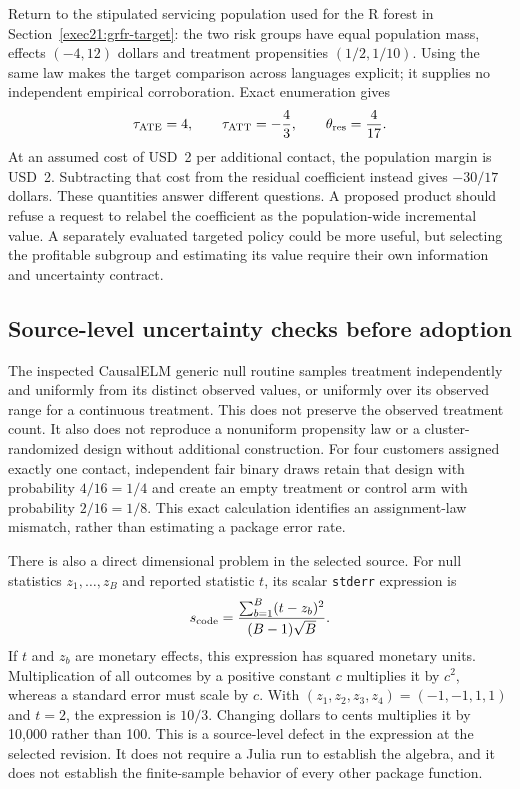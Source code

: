 Return to the stipulated servicing population used for the R forest in
Section~\ref{exec21:grfr-target}: the two risk groups have equal population
mass, effects $(-4,12)$ dollars and treatment propensities $(1/2,1/10)$.
Using the same law makes the target comparison across languages explicit;
it supplies no independent empirical corroboration. Exact enumeration gives
\begin{equation}
\label{exec21:effects-targetexample}
 \tau_{\rm ATE}=4,\qquad
 \tau_{\rm ATT}=-\frac43,\qquad
 \theta_{\rm res}=\frac4{17}.
\end{equation}
At an assumed cost of USD~2 per additional contact, the population margin is
USD~2. Subtracting that cost from the residual coefficient instead gives
$-30/17$ dollars. These quantities answer different questions. A proposed
product should refuse a request to relabel the coefficient as the
population-wide incremental value. A separately evaluated targeted policy
could be more useful, but selecting the profitable subgroup and estimating
its value require their own information and uncertainty contract.
\citep{exec21_effects_reference}

\subsection{Source-level uncertainty checks before adoption}
\label{exec21:effects-uncertainty}

The inspected CausalELM generic null routine samples treatment independently
and uniformly from its distinct observed values, or uniformly over its
observed range for a continuous treatment. This does not preserve the
observed treatment count. It also does not reproduce a nonuniform propensity
law or a cluster-randomized design without additional construction. For four
customers assigned exactly one contact, independent fair binary draws retain
that design with probability $4/16=1/4$ and create an empty treatment or
control arm with probability $2/16=1/8$. This exact calculation identifies an
assignment-law mismatch, rather than estimating a package error rate.
\citep{exec21_effects_causalelm,exec21_effects_reference}

There is also a direct dimensional problem in the selected source. For null
statistics $z_1,\ldots,z_B$ and reported statistic $t$, its scalar
\texttt{stderr} expression is
\begin{equation}
\label{exec21:effects-scale}
 s_{\rm code}=\frac{\sum_{b=1}^{B}(t-z_b)^2}{(B-1)\sqrt B}.
\end{equation}
If $t$ and $z_b$ are monetary effects, this expression has squared monetary
units. Multiplication of all outcomes by a positive constant $c$ multiplies
it by $c^2$, whereas a standard error must scale by $c$. With
$(z_1,z_2,z_3,z_4)=(-1,-1,1,1)$ and $t=2$, the expression is $10/3$.
Changing dollars to cents multiplies it by 10,000 rather than 100. This is a
source-level defect in the expression at the selected revision. It does not
require a Julia run to establish the algebra, and it does not establish the
finite-sample behavior of every other package function.
\citep{exec21_effects_causalelm,exec21_effects_reference}

